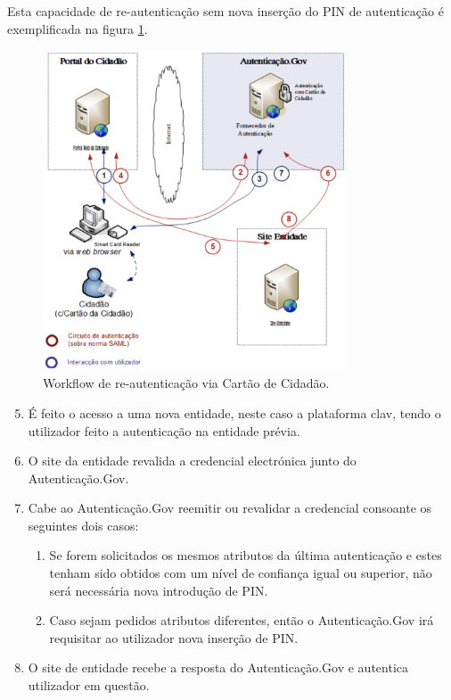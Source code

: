 Esta capacidade de re-autenticação sem nova inserção do PIN de autenticação é exemplificada na figura \ref{workflow2}.

\begin{figure}[h]
    \centering
    \includegraphics[width=0.8\textwidth]{img/authgov/workflow2.png}
    \caption{Workflow de re-autenticação via Cartão de Cidadão.}
    \label{workflow2}
\end{figure}

\begin{enumerate}
    \setcounter{enumi}{4}
    \item É feito o acesso a uma nova entidade, neste caso a plataforma \gls{clav}, tendo o utilizador feito a autenticação na entidade prévia.
    \item O site da entidade revalida a credencial electrónica junto do Autenticação.Gov.
    \item Cabe ao Autenticação.Gov reemitir ou revalidar a credencial consoante os seguintes dois casos:
    \begin{enumerate}
        \item Se forem solicitados os mesmos atributos da última autenticação e estes tenham sido obtidos com um nível de confiança igual ou superior, não será necessária nova introdução de PIN.
        \item Caso sejam pedidos atributos diferentes, então o Autenticação.Gov irá requisitar ao utilizador nova inserção de PIN.
    \end{enumerate}
    \item O site de entidade recebe a resposta do Autenticação.Gov e autentica utilizador em questão.
\end{enumerate}

